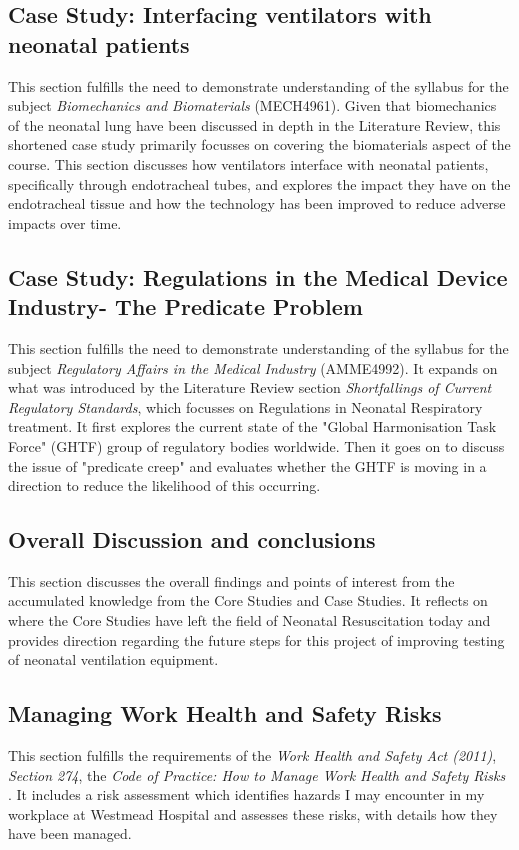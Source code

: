 \documentclass[12pt, openany, oneside]{book}
\begin{document}
\subsection{Case Study: Interfacing ventilators with neonatal patients}
This section fulfills the need to demonstrate understanding of the syllabus for the subject \textit{Biomechanics and Biomaterials} (MECH4961). Given that biomechanics of the neonatal lung have been discussed in depth in the Literature Review, this shortened case study primarily focusses on covering the biomaterials aspect of the course. This section discusses how ventilators interface with neonatal patients, specifically through endotracheal tubes, and explores the impact they have on the endotracheal tissue and how the technology has been improved to reduce adverse impacts over time.

\subsection{Case Study: Regulations in the Medical Device Industry- The Predicate Problem}
This section fulfills the need to demonstrate understanding of the syllabus for the subject \textit{Regulatory Affairs in the Medical Industry} (AMME4992). It expands on what was introduced by the Literature Review section \textit{Shortfallings of Current Regulatory Standards}, which focusses on Regulations in Neonatal Respiratory treatment. It first explores the current state of the "Global Harmonisation Task Force" (GHTF) group of regulatory bodies worldwide. Then it goes on to discuss the issue of "predicate creep" and evaluates whether the GHTF is moving in a direction to reduce the likelihood of this occurring.



\subsection{Overall Discussion and conclusions}
This section discusses the overall findings and points of interest from the accumulated knowledge from the Core Studies and Case Studies. It reflects on where the Core Studies have left the field of Neonatal Resuscitation today and provides direction regarding the future steps for this project of improving testing of neonatal ventilation equipment.

\subsection{Managing Work Health and Safety Risks}
This section fulfills the requirements of the \textit{Work Health and Safety Act (2011)}, \textit{Section 274}, the \textit{Code of Practice: How to Manage Work Health and Safety Risks} \cite{whs2011}. It includes a risk assessment which identifies hazards I may encounter in my workplace at Westmead Hospital and assesses these risks, with details how they have been managed.
\end{document}
